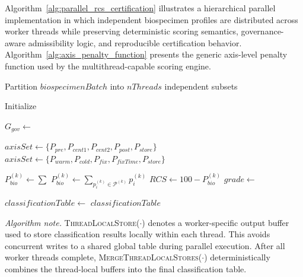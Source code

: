 \documentclass[preprint,12pt]{elsarticle}
\begin{document}
Algorithm~\ref{alg:parallel_rcs_certification} illustrates a hierarchical parallel implementation in which independent biospecimen profiles are distributed across worker threads while preserving deterministic scoring semantics, governance-aware admissibility logic, and reproducible certification behavior. Algorithm~\ref{alg:axis_penalty_function} presents the generic axis-level penalty function used by the multithread-capable scoring engine.

\begin{algorithm}[!htbp]
\caption{Hierarchical multithreaded governance-aware RCS certification}
\label{alg:parallel_rcs_certification}
\footnotesize
\begin{algorithmic}[1]


\State Partition $biospecimenBatch$ into $nThreads$ independent subsets

    \State Initialize 


        \State $G_{gov} \gets$ 

            \State {}
        \Else
                \State $axisSet \gets \{P_{pre}, P_{cent1}, P_{cent2}, P_{post}, P_{store}\}$
                \State $axisSet \gets \{P_{warm}, P_{cold}, P_{fix}, P_{fixTime}, P_{store}\}$
            \EndIf

            \State $P_{bio}^{(k)} \gets \sum$ 
            \State $P_{bio}^{(k)} \gets \sum_{p_i^{(k)} \in \mathcal{P}^{(k)}} p_i^{(k)}$
            \State $RCS \gets 100 - P_{bio}^{(k)}$
            \State $grade \gets$ 
            \State {}
        \EndIf

    \EndFor
\EndFor

\State $classificationTable \gets$ 
\State \Return $classificationTable$

\EndProcedure

\end{algorithmic}

\vspace{0.5em}
\noindent\footnotesize
\textit{Algorithm note.}
\textsc{ThreadLocalStore}(\(\cdot\)) denotes a worker-specific output buffer used to store classification results locally within each thread. This avoids concurrent writes to a shared global table during parallel execution. After all worker threads complete, \textsc{MergeThreadLocalStores}(\(\cdot\)) deterministically combines the thread-local buffers into the final classification table.
\normalsize
\end{algorithm}
\end{document}
